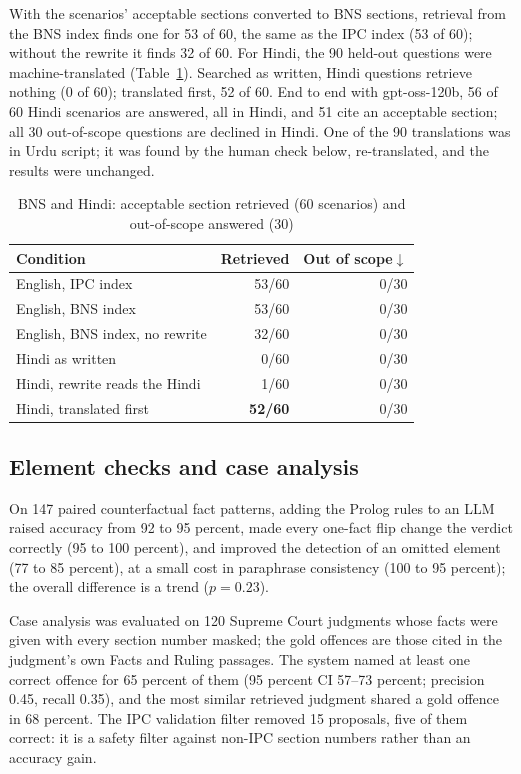 \documentclass[conference]{IEEEtran}
\begin{document}
With the scenarios' acceptable sections converted to BNS sections, retrieval from the BNS index finds
one for 53 of 60, the same as the IPC index (53 of 60); without the rewrite it finds 32 of 60. For
Hindi, the 90 held-out questions were machine-translated (Table~\ref{tab:bnshindi}). Searched as
written, Hindi questions retrieve nothing (0 of 60); translated first, 52 of 60. End to end with
gpt-oss-120b, 56 of 60 Hindi scenarios are answered, all in Hindi, and 51 cite an acceptable section;
all 30 out-of-scope questions are declined in Hindi. One of the 90 translations was in Urdu script;
it was found by the human check below, re-translated, and the results were unchanged.

\begin{table}[t]
\caption{BNS and Hindi: acceptable section retrieved (60 scenarios) and out-of-scope answered (30)}
\label{tab:bnshindi}
\centering
\footnotesize
\begin{tabular}{lrr}
\toprule
Condition & Retrieved & Out of scope$\downarrow$ \\
\midrule
English, IPC index & 53/60 & 0/30 \\
English, BNS index & 53/60 & 0/30 \\
English, BNS index, no rewrite & 32/60 & 0/30 \\
Hindi as written & 0/60 & 0/30 \\
Hindi, rewrite reads the Hindi & 1/60 & 0/30 \\
Hindi, translated first & \textbf{52/60} & 0/30 \\
\bottomrule
\end{tabular}
\end{table}

\subsection{Element checks and case analysis}

On 147 paired counterfactual fact patterns, adding the Prolog rules to an LLM raised accuracy from
92 to 95 percent, made every one-fact flip change the verdict correctly (95 to 100 percent), and
improved the detection of an omitted element (77 to 85 percent), at a small cost in paraphrase
consistency (100 to 95 percent); the overall difference is a trend ($p=0.23$).

Case analysis was evaluated on 120 Supreme Court judgments whose facts were given with every section
number masked; the gold offences are those cited in the judgment's own Facts and Ruling passages. The
system named at least one correct offence for 65 percent of them (95 percent CI 57--73 percent;
precision 0.45, recall 0.35), and the most similar retrieved judgment shared a gold offence in 68
percent. The IPC validation filter removed 15 proposals, five of them correct: it is a safety filter
against non-IPC section numbers rather than an accuracy gain.
\end{document}
